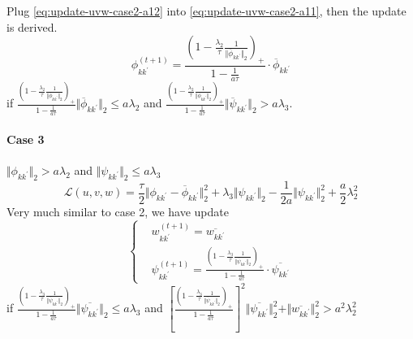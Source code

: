 \documentclass[12pt, a4paper, oneside]{article}
\numberwithin{equation}{section}
\begin{document}
\begin{itemize}
\begin{itemize}
\begin{equation}
	\end{equation}
	Plug \ref{eq:update-uvw-case2-a12} into \ref{eq:update-uvw-case2-a11}, then the update is derived.
	\begin{equation}
	\label{eq:update-uvw-case2-final}
	\phi_{k{k^\prime}}^{(t+1)} = \frac{\left(1 - \frac{\lambda_2}{\tau}\frac{1}{\Vert\overline\phi_{k{k^\prime}}\Vert_2}\right)_+}{1-\frac{1}{a\tau}} \cdot \overline\phi_{k{k^\prime}}
	\end{equation}
	if $\frac{\left(1 - \frac{\lambda_2}{\tau}\frac{1}{\Vert\overline\phi_{k{k^\prime}}\Vert_2}\right)_+}{1-\frac{1}{a\tau}} \Vert\overline\phi_{k{k^\prime}}\Vert_2 \leq a\lambda_2$ and $\frac{\left(1 - \frac{\lambda_2}{\tau}\frac{1}{\Vert\overline\phi_{k{k^\prime}}\Vert_2}\right)_+}{1-\frac{1}{a\tau}} \Vert\overline\psi_{k{k^\prime}}\Vert_2 > a\lambda_3$.
	\end{itemize}
\end{itemize}

\paragraph{Case 3} $\Vert\phi_{k{k^\prime}}\Vert_2 > a\lambda_2$ and $\Vert\psi_{k{k^\prime}}\Vert_2 \leq a\lambda_3$
\begin{equation}
	\label{eq:update_uvw-case3}
	\mathcal{L}(u,v,w) =  \frac{\tau}{2}\Vert\phi_{k{k^\prime}}-\overline\phi_{k{k^\prime}}\Vert_2^2 + \lambda_3 \Vert\psi_{k{k^\prime}}\Vert_2 - \frac{1}{2a}\Vert\psi_{k{k^\prime}}\Vert_2^2 + \frac{a}{2}\lambda_2^2
\end{equation}
Very much similar to case 2, we have update
\begin{equation}
\label{eq:update-uvw-case3-final}
\left\{
\begin{aligned}
& w^{(t+1)}_{k{k^\prime}} = \overline{w_{k{k^\prime}}} \\
& \psi_{k{k^\prime}}^{(t+1)}= \frac{\left(1 - \frac{\lambda_3}{\tau}\frac{1}{\Vert\overline\psi_{k{k^\prime}}\Vert_2}\right)_+}{1-\frac{1}{a\tau}}\cdot \overline{\psi_{k{k^\prime}}}
\end{aligned}
\right.
\end{equation}
if $\frac{\left(1 - \frac{\lambda_3}{\tau}\frac{1}{\Vert\overline\psi_{k{k^\prime}}\Vert_2}\right)_+}{1-\frac{1}{a\tau}} \Vert\overline{\psi_{k{k^\prime}}}\Vert_2 \leq a\lambda_3$ and $\left[\frac{\left(1 - \frac{\lambda_3}{\tau}\frac{1}{\Vert\overline\psi_{k{k^\prime}}\Vert_2}\right)_+}{1-\frac{1}{a\tau}}\right]^2 \Vert\overline{\psi_{k{k^\prime}}}\Vert_2^2 + \Vert\overline{w_{k{k^\prime}}}\Vert_2^2 > a^2\lambda_2^2$
\end{document}
